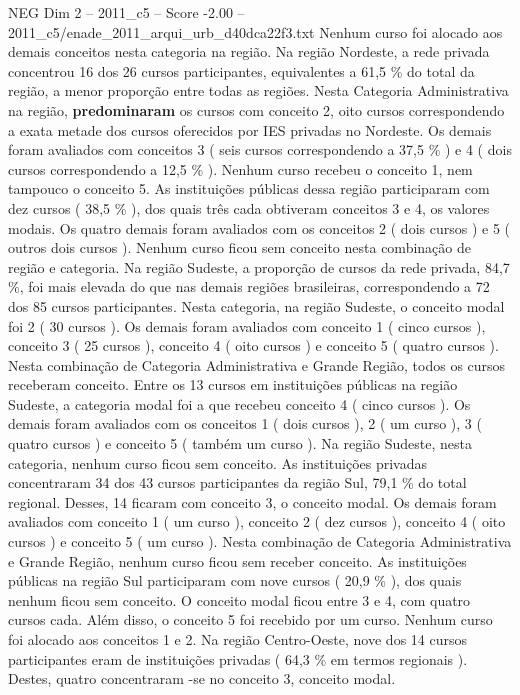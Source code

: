 \begin{textsample}{NEG Dim 2 – 2011\_c5 – Score -2.00 – 2011\_c5/enade\_2011\_arqui\_urb\_d40dca22f3.txt}
Nenhum curso foi alocado aos demais conceitos nesta categoria na região.
Na região Nordeste, a rede privada concentrou 16 dos 26 cursos participantes, equivalentes a 61,5 \% do total da região, a menor proporção entre todas as regiões.
Nesta Categoria Administrativa na região, \textbf{predominaram} os cursos com conceito 2, oito cursos correspondendo a exata metade dos cursos oferecidos por IES privadas no Nordeste.
Os demais foram avaliados com conceitos 3 ( seis cursos correspondendo a 37,5 \% ) e 4 ( dois cursos correspondendo a 12,5 \% ).
Nenhum curso recebeu o conceito 1, nem tampouco o conceito 5.
As instituições públicas dessa região participaram com dez cursos ( 38,5 \% ), dos quais três cada obtiveram conceitos 3 e 4, os valores modais.
Os quatro demais foram avaliados com os conceitos 2 ( dois cursos ) e 5 ( outros dois cursos ).
Nenhum curso ficou sem conceito nesta combinação de região e categoria.
Na região Sudeste, a proporção de cursos da rede privada, 84,7 \%, foi mais elevada do que nas demais regiões brasileiras, correspondendo a 72 dos 85 cursos participantes.
Nesta categoria, na região Sudeste, o conceito modal foi 2 ( 30 cursos ).
Os demais foram avaliados com conceito 1 ( cinco cursos ), conceito 3 ( 25 cursos ), conceito 4 ( oito cursos ) e conceito 5 ( quatro cursos ).
Nesta combinação de Categoria Administrativa e Grande Região, todos os cursos receberam conceito.
Entre os 13 cursos em instituições públicas na região Sudeste, a categoria modal foi a que recebeu conceito 4 ( cinco cursos ).
Os demais foram avaliados com os conceitos 1 ( dois cursos ), 2 ( um curso ), 3 ( quatro cursos ) e conceito 5 ( também um curso ).
Na região Sudeste, nesta categoria, nenhum curso ficou sem conceito.
As instituições privadas concentraram 34 dos 43 cursos participantes da região Sul, 79,1 \% do total regional.
Desses, 14 ficaram com conceito 3, o conceito modal.
Os demais foram avaliados com conceito 1 ( um curso ), conceito 2 ( dez cursos ), conceito 4 ( oito cursos ) e conceito 5 ( um curso ).
Nesta combinação de Categoria Administrativa e Grande Região, nenhum curso ficou sem receber conceito.
As instituições públicas na região Sul participaram com nove cursos ( 20,9 \% ), dos quais nenhum ficou sem conceito.
O conceito modal ficou entre 3 e 4, com quatro cursos cada.
Além disso, o conceito 5 foi recebido por um curso.
Nenhum curso foi alocado aos conceitos 1 e 2.
Na região Centro-Oeste, nove dos 14 cursos participantes eram de instituições privadas ( 64,3 \% em termos regionais ).
Destes, quatro concentraram -se no conceito 3, conceito modal.

\end{textsample}
